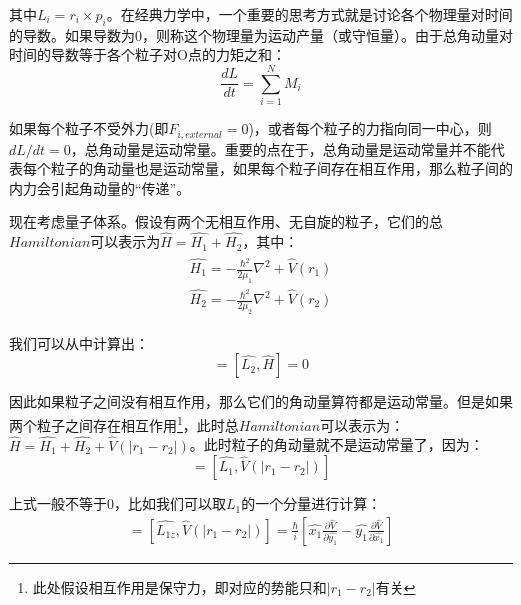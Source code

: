     其中$L_i=r_i\times p_i$。在经典力学中，一个重要的思考方式就是讨论各个物理量对时间的导数。如果导数为0，则称这个物理量为运动产量（或守恒量）。由于总角动量对时间的导数等于各个粒子对O点的力矩之和：
    \begin{equation}
        \frac{dL}{dt}=\sum_{i=1}^{N}M_i
    \end{equation}
    
    如果每个粒子不受外力(即$F_{i,external}=0$)，或者每个粒子的力指向同一中心，则$dL/dt=0$，总角动量是运动常量。重要的点在于，总角动量是运动常量并不能代表每个粒子的角动量也是运动常量，如果每个粒子间存在相互作用，那么粒子间的内力会引起角动量的“传递”。
    
    现在考虑量子体系。假设有两个无相互作用、无自旋的粒子，它们的总$Hamiltonian$可以表示为$\hat{H}=\hat{H_1}+\hat{H_2}$，其中：
    \begin{align}
        \begin{split}
            \hat{H_1}=-\frac{\hbar^2}{2\mu_1}\nabla^2+\hat{V}(r_1)\\
            \hat{H_2}=-\frac{\hbar^2}{2\mu_2}\nabla^2+\hat{V}(r_2)
        \end{split}
    \end{align}
    
    我们可以从中计算出：
    \begin{equation}
        [\hat{L_1},\hat{H}]=[\hat{L_2},\hat{H}]=0
    \end{equation}
    
    因此如果粒子之间没有相互作用，那么它们的角动量算符都是运动常量。但是如果两个粒子之间存在相互作用\footnote{此处假设相互作用是保守力，即对应的势能只和$|r_1-r_2|$有关}，此时总$Hamiltonian$可以表示为：$\hat{H}=\hat{H_1}+\hat{H_2}+\hat{V}(|r_1-r_2|)$。此时粒子的角动量就不是运动常量了，因为：
    \begin{equation}
        [\hat{L_1},\hat{H}]=[\hat{L_1},\hat{V}(|r_1-r_2|)]
    \end{equation}
    
    上式一般不等于0，比如我们可以取$L_1$的一个分量进行计算：
    \begin{align}
            [\hat{L_{1z},\hat{H}}]=[\hat{L_{1z}},\hat{V}(|r_1-r_2|)]
            =\frac{\hbar}{i}[\hat{x_1}\frac{\partial \hat{V}}{\partial \hat{y_1}}-\hat{y_1}\frac{\partial \hat{V}}{\partial \hat{x_1}}]
    \end{align}
    
